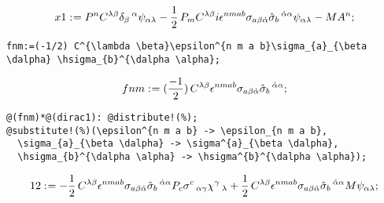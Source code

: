 \documentclass[11pt]{article}
\def\specialcolon{\mathrel{\mathop{:}}\hspace{-.5em}}
\begin{document}
\begin{dmath*}[compact, spread=2pt]
x1\specialcolon{}= {P}^{n} {C}^{\lambda \beta} {\delta}_{\beta}\,^{\alpha} {\psi}_{\alpha \lambda} - \frac{1}{2}\, {P}_{m} {C}^{\lambda \beta} i {\epsilon}^{n m a b} {\sigma}_{a \beta \dot{\alpha}} {\hat{\sigma}}_{b}\,^{\dot{\alpha} \alpha} {\psi}_{\alpha \lambda} - M {A}^{n};
\end{dmath*}
{\color[named]{Blue}\begin{verbatim}
fnm:=(-1/2) C^{\lambda \beta}\epsilon^{n m a b}\sigma_{a}_{\beta \dalpha} \hsigma_{b}^{\dalpha \alpha};
\end{verbatim}}
\begin{dmath*}[compact, spread=2pt]
fnm\specialcolon{}= (\frac{-1}{2})\, {C}^{\lambda \beta} {\epsilon}^{n m a b} {\sigma}_{a \beta \dot{\alpha}} {\hat{\sigma}}_{b}\,^{\dot{\alpha} \alpha};
\end{dmath*}
{\color[named]{Blue}\begin{verbatim}
@(fnm)*@(dirac1): @distribute!(%);
@substitute!(%)(\epsilon^{n m a b} -> \epsilon_{n m a b},
  \sigma_{a}_{\beta \dalpha} -> \sigma^{a}_{\beta \dalpha},
  \hsigma_{b}^{\dalpha \alpha} -> \hsigma^{b}^{\dalpha \alpha});
\end{verbatim}}
\begin{dmath*}[compact, spread=2pt]
12\specialcolon{}=  - \frac{1}{2}\, {C}^{\lambda \beta} {\epsilon}^{n m a b} {\sigma}_{a \beta \dot{\alpha}} {\hat{\sigma}}_{b}\,^{\dot{\alpha} \alpha} {P}_{c} {\sigma}^{c}\,_{\alpha \gamma} {\chi}^{\gamma}\,_{\lambda} + \frac{1}{2}\, {C}^{\lambda \beta} {\epsilon}^{n m a b} {\sigma}_{a \beta \dot{\alpha}} {\hat{\sigma}}_{b}\,^{\dot{\alpha} \alpha} M {\psi}_{\alpha \lambda};
\end{dmath*}
\end{document}
